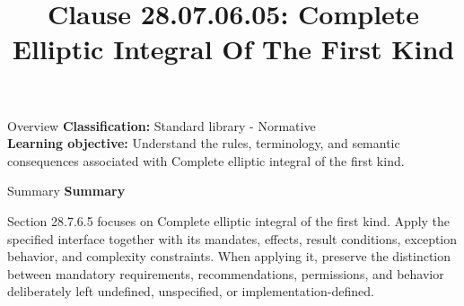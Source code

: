 \documentclass[10pt,letterpaper]{article}
\title{Clause 28.07.06.05: Complete Elliptic Integral Of The First Kind}
\author{}
\date{}
\begin{document}
\maketitle
\begin{CornellOverviewBox}{Overview}
\textbf{Classification:} Standard library - Normative\\[2pt]
\textbf{Learning objective:} Understand the rules, terminology, and semantic consequences associated with Complete elliptic integral of the first kind.
\end{CornellOverviewBox}\begin{CornellSummaryBox}{Summary}
{\sffamily\bfseries\color{Accent} Summary}\par\vspace{3pt}Section 28.7.6.5 focuses on Complete elliptic integral of the first kind. Apply the specified interface together with its mandates, effects, result conditions, exception behavior, and complexity constraints. When applying it, preserve the distinction between mandatory requirements, recommendations, permissions, and behavior deliberately left undefined, unspecified, or implementation-defined.
\end{CornellSummaryBox}
\end{document}
